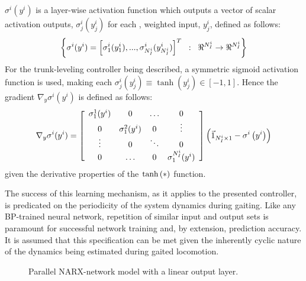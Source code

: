 		$\sigma^{i}(y^{i})$ is a layer-wise activation function which outputs a vector of scalar activation outputs, $\sigma_{j}^{i}(y_{j}^{i}) $ for each \Jth, weighted input, $y_{j}^{i}$, defined as follows:
		\begin{equation*}
			\left\{ \sigma^{i}(y^{i}) = \left[ \sigma_{1}^{i}(y_{1}^{i}),...,\sigma_{N_{I}^{i}}^{i}(y_{N_{I}^{i}}^{i}) \right]^{T} \hspace{2mm} : \hspace{2mm} \Re^{N_{I}^{i}} \rightarrow \Re^{N_{I}^{i}}\right\}
		\end{equation*}
		For the trunk-leveling controller being described, a symmetric sigmoid activation function is used, making each $\sigma_{j}^{i}(y_{j}^{i}) \equiv \tanh(y_{j}^{i}) \in [-1,1]$. Hence the gradient $\nabla_{y} \sigma^{i}(y^{i})$ is defined as follows: 
		\newcommand{\acti}[1]{\sigma^{#1}_{1}(y^{i})}
		\begin{equation}
			\nabla_{y} \sigma^{i}(y^{i})  =
			\left[
			\begin{array}{cccc}
				\acti{1}	&	0		&	\ldots 		&	0 			\\	
				0			&	\acti{2}&	0			& 	\vdots 		\\
				\vdots 		&	0		& 	\ddots 		& 	0			\\
					0			&	\ldots	&	0			& 	\acti{N_{I}^{i}}
			\end{array}
			\right]
			\wrap{\vec{1}_{N_{I}^{i}\times1} - \sigma^{i}\wrap{y^{i} } }
			\label{eq::bp_sigmoid_deriv}
		\end{equation} 
		given the derivative properties of the $\tanh\left(*\right)$ function.
		
		The success of this learning mechanism, as it applies to the presented controller, is predicated on the periodicity of the system dynamics during gaiting. Like any BP-trained neural network, repetition of similar input and output sets is paramount for successful network training and, by extension, prediction accuracy. It is assumed that this specification can be met given the inherently cyclic nature of the dynamics being estimated during gaited locomotion. 
			\begin{figure}[t!]
				\centering
				\caption{Parallel NARX-network model with a linear output layer.}
				\label{fig::narx_net}
			\end{figure}

